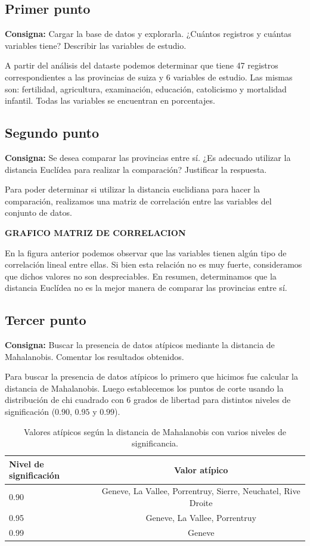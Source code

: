 \documentclass{article} %
\begin{document}
\subsection{Primer punto}

\textbf{Consigna:} Cargar la base de datos y explorarla. ¿Cuántos registros y cuántas variables tiene? Describir las variables de estudio.

A partir del análisis del dataste podemos determinar que tiene 47 registros correspondientes a las provincias de suiza y 6 variables de estudio. Las mismas son: fertilidad, agricultura, examinación, educación, catolicismo y mortalidad infantil. Todas las variables se encuentran en porcentajes.

\subsection{Segundo punto}

\textbf{Consigna:} Se desea comparar las provincias entre sí. ¿Es adecuado utilizar la distancia Euclídea para realizar la comparación? Justificar la respuesta.

Para poder determinar si utilizar la distancia euclidiana para hacer la comparación, realizamos una matriz de correlación entre las variables del conjunto de datos.

\textbf{GRAFICO MATRIZ DE CORRELACION}

En la figura anterior podemos observar que las variables tienen algún tipo de correlación lineal entre ellas. Si bien esta relación no es muy fuerte, consideramos que dichos valores no son despreciables. En resumen, determinamos que la distancia Euclídea no es la mejor manera de comparar las provincias entre sí.

\subsection{Tercer punto}

\textbf{Consigna:} Buscar la presencia de datos atípicos mediante la distancia de Mahalanobis. Comentar los resultados obtenidos.

Para buscar la presencia de datos atípicos lo primero que hicimos fue calcular la distancia de Mahalanobis. Luego establecemos los puntos de corte usando la distribución de chi cuadrado con 6 grados de libertad para distintos niveles de significación ($0.90$, $0.95$ y $0.99$). 

\begin{table}[H]
	\centering
		\begin{tabular}{||l | c ||}
			\hline
			\hline
			Nivel de significación & Valor atípico\\
			\hline			
			\hline
			0.90 & Geneve, La Vallee, Porrentruy, Sierre, Neuchatel, Rive Droite\\
			\hline
			0.95 & Geneve, La Vallee, Porrentruy\\
			\hline
			0.99 & Geneve\\
			\hline
			\hline
		\end{tabular}
		\caption{Valores atípicos según la distancia de Mahalanobis con varios niveles de significancia.}
	\label{tab:table-punto-3-3}
\end{table}
\end{document}
